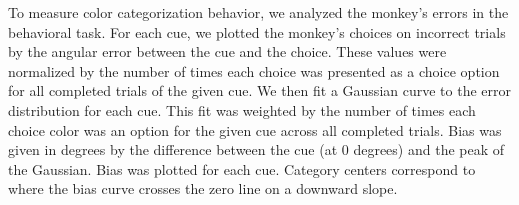 
To measure color categorization behavior, we analyzed the monkey's errors in the behavioral task. For each cue, we plotted the monkey's choices on incorrect trials by the angular error between the cue and the choice. These values were normalized by the number of times each choice was presented as a choice option for all completed trials of the given cue. 
We then fit a Gaussian curve to the error distribution for each cue. This fit was weighted by the number of times each choice color was an option for the given cue across all completed trials. Bias was given in degrees by the difference between the cue (at 0 degrees) and the peak of the Gaussian. Bias was plotted for each cue. Category centers correspond to where the bias curve crosses the zero line on a downward slope.  